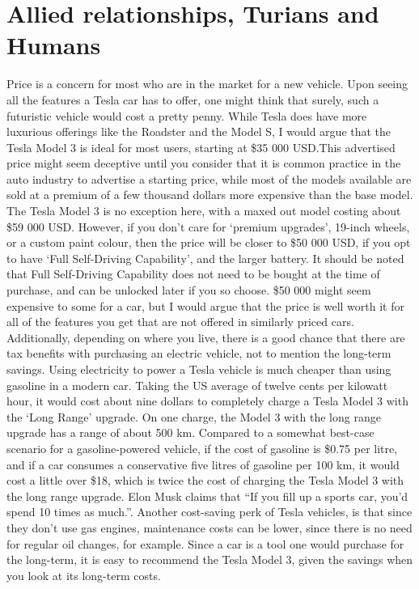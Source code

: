 \documentclass{IEEEtran}
\begin{document}
\section{Allied relationships, Turians and Humans}
Price is a concern for most who are in the market for a new vehicle. Upon seeing
all the features a Tesla car has to offer, one might think that surely,
such a futuristic vehicle would cost a pretty penny. While Tesla does have
more luxurious offerings like the Roadster and the Model S, I would argue that the
Tesla Model 3 is ideal for most users, starting at \$35 000 USD.\@ This advertised
price might seem deceptive until you consider that it is common practice
in the auto industry to advertise a starting price, while most of the models available
are sold at a premium of a few thousand dollars more expensive than the base model. The
Tesla Model 3 is no exception here, with a maxed out model costing about
\$59 000 USD\cite{maxprice}. However, if you don't care for `premium upgrades',
19-inch wheels, or a custom paint colour, then the price will be closer to
\$50 000 USD, if you opt to have `Full Self-Driving Capability', and the larger
battery. It should be noted that Full Self-Driving Capability does not need to be
bought at the time of purchase, and can be unlocked later if you so choose.
\$50 000 might seem expensive to some for a car, but I would argue that the price is well worth
it for all of the features you get that are not offered in similarly priced cars.
Additionally, depending on where you live, there is a good chance that there are
tax benefits with purchasing an electric vehicle, not to mention the long-term savings.
Using electricity to power a Tesla vehicle is much cheaper than using gasoline in
a modern car. Taking the US average of twelve cents per kilowatt hour, it would
cost about nine dollars to completely charge a Tesla Model 3 with the `Long Range'
upgrade. On one charge, the Model 3 with the long range upgrade has a range of about
500 km\cite{500km}. Compared to a somewhat best-case scenario for a gasoline-powered vehicle,
if the cost of gasoline is \$0.75 per litre\cite{75cents}, and if a car consumes a conservative five
litres of gasoline per 100 km\cite{priusmpg}, it would cost a little over \$18, which is
twice the cost of charging the Tesla Model 3 with the long range upgrade. Elon Musk claims that
``If you fill up a sports car, you'd spend 10 times as much.''\cite{rosoff_elon_nodate}. Another cost-saving
perk of Tesla vehicles, is that since they don't use gas engines, maintenance costs
can be lower, since there is no need for regular oil changes, for example.\cite{oilchange}
Since a car is a tool one would purchase for the long-term, it is easy to
recommend the Tesla Model 3, given the savings when you look at its long-term costs.
\end{document}
